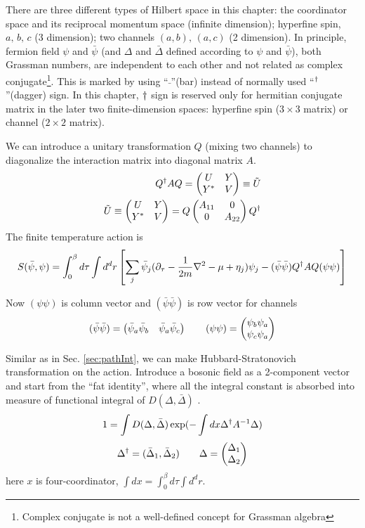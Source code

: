 There are three different types of Hilbert space in this chapter:  the coordinator space and its reciprocal momentum space (infinite dimension);   hyperfine spin, $a,\,b,\,c$ (3 dimension);  two channels $(a,b),\,(a,c)$ (2 dimension).  In principle, fermion field $\psi$ and $\bar\psi$ (and $\Delta$ and $\bar\Delta$ defined according to $\psi$ and $\bar\psi$),  both Grassman numbers, are independent to each other  and  not related as complex conjugate\footnote{Complex conjugate is not a well-defined concept for Grassman algebra}.  This is marked by using ``$\bar{\;}$''(bar) instead of normally used ``$^{\dagger}$''(dagger) sign. In this chapter, $^{}\dagger$ sign is reserved only for hermitian conjugate matrix in the later two finite-dimension spaces: hyperfine spin ($3\times3$ matrix) or channel ($2\times2$ matrix). 

We can introduce a unitary transformation $Q$ (mixing two channels) to diagonalize the interaction matrix into diagonal matrix $A$.
\begin{equation}
\begin{split}
Q^{\dagger}AQ=\begin{pmatrix}U&Y\\Y^{*}&V\end{pmatrix}\equiv{}\tilde{U}\\
\tilde{U}\equiv\begin{pmatrix}U&Y\\Y^{*}&V\end{pmatrix}=Q\begin{pmatrix}A_{11}&0\\0&A_{22}\end{pmatrix}Q^{\dagger}
\end{split}
\end{equation}
The finite temperature action is 
\begin{equation}\label{eq:pathInt2:actionFermi}
S(\bar\psi,\psi)=\int^{\beta}_{0}d\tau\int{d^{d}r}\left[\sum_{j}\bar\psi_{j}(\partial_\tau-\frac{1}{2m}\nabla^{2}-\mu+\eta_{j})\psi_{j}
-(\bar\psi\bar\psi)Q^{\dagger}AQ(\psi\psi)\right]
\end{equation}

Now $(\psi\psi)$ is column vector and $(\bar\psi\bar\psi)$ is row vector for channels
\begin{equation*}
(\bar\psi\bar\psi)=\begin{pmatrix}\bar\psi_{a}\bar\psi_{b}&\bar\psi_{a}\bar\psi_{c}\end{pmatrix}
\qquad(\psi\psi)=\begin{pmatrix}\psi_{b}\psi_{a}\\\psi_{c}\psi_{a}\end{pmatrix}
\end{equation*}

Similar as in Sec. \ref{sec:pathInt}, we can make Hubbard-Stratonovich transformation on the action.   Introduce a bosonic field as a 2-component vector   and start from the ``fat identity'', where  all the integral constant is absorbed into measure of functional integral of $D(\Delta,\bar\Delta)$ \cite{Altland}.
\begin{equation}\label{eq:pathInt2:indetity}
1=\int{D(\Delta,\bar\Delta)}\exp(-\int{dx}\Delta^{\dagger}A^{-1}\Delta)
\end{equation}
\[
\Delta^{\dagger}=(\bar\Delta_{1},\bar\Delta_{2})\qquad\Delta=\begin{pmatrix}\Delta_{1}\\\Delta_{2}\end{pmatrix}
\]
here $x$ is four-coordinator,  $\int{dx}=\int^{\beta}_{0}d\tau\int{d^{d}r}$. 

